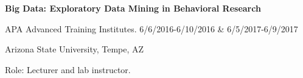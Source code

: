 \documentclass[letterpaper,10pt]{article}
\begin{document}
\begin{itemize}
%
\begin{center}
	\parbox{6.5in}{\textbf{Big Data: Exploratory Data Mining in Behavioral Research}}
	\parbox{6.5in}{APA Advanced Training Institutes. 6/6/2016-6/10/2016 \& 6/5/2017-6/9/2017 }
	\parbox{6.5in}{Arizona State University, Tempe, AZ}
	\parbox{6.5in}{Role: Lecturer and lab instructor.}
\end{center}

%

%

%



\end{itemize}
\end{document}
